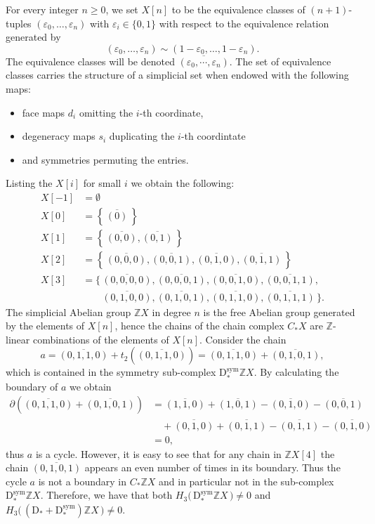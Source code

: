 \documentclass[12pt]{amsart}
\theoremstyle{plain}
\numberwithin{lemma}{\DefaultNumberTheoremWithin}
\numberwithin{claim}{\DefaultNumberTheoremWithin}
\numberwithin{theorem}{\DefaultNumberTheoremWithin}
\numberwithin{corollary}{\DefaultNumberTheoremWithin}
\numberwithin{proposition}{\DefaultNumberTheoremWithin}
\numberwithin{conjecture}{\DefaultNumberTheoremWithin}
\theoremstyle{definition}
\theoremstyle{definition}
\numberwithin{question}{\DefaultNumberTheoremWithin}
\theoremstyle{definition}
\numberwithin{problem}{\DefaultNumberTheoremWithin}
\theoremstyle{remark}
\numberwithin{remark}{\DefaultNumberTheoremWithin}
\theoremstyle{remark}
\numberwithin{example}{\DefaultNumberTheoremWithin}
\def\blt{*}
\def\ve{\varepsilon}
\def\ZZ{\mathbb Z}
\def\Deg{\mathrm{D}}    %
\def\sDeg{\Deg^{\mathrm{sym}}}  %
\newcommand{\del}{\partial}
\newcommand{\projzero}[1]{\overline{(#1)}}
\newcommand{\projone}[2]{\overline{(#1,#2)}}
\newcommand{\projtwo}[3]{\overline{(#1,#2,#3)}}
\newcommand{\projthree}[4]{\overline{(#1,#2,#3,#4)}}
\begin{document}
For every integer $n \geq 0$, we set $X[n]$ to be the equivalence classes of $(n+1)$-tuples $(\ve_0,\ldots,\ve_{n})$ with $\ve_i\in\{0,1\}$ with respect to
the equivalence relation generated by $$(\ve_0,\ldots,\ve_{n}) \sim (1-\ve_0,\ldots,1-\ve_{n}).$$ The equivalence classes 
will be denoted $\overline{(\ve_0,\cdots ,\ve_{n})}$. The set of 
equivalence classes carries the structure of a simplicial set 
when endowed with the following maps: 
\begin{itemize}
\item face maps $d_i$ omitting the $i$-th coordinate,
\item degeneracy maps $s_i$  duplicating the $i$-th coordintate
\item and symmetries permuting the entries. 
\end{itemize}
Listing the $X[i]$ for small $i$ we obtain the following:
\begin{align*}
    X[-1] &=\emptyset  \\
    X[0]  &= \left\{\,\projzero{0}\,\right\}  \\
    X[1]  &= \left\{\,\projone{0}{0},\projone{0}{1}\,\right\}\\
    X[2]  &= \left\{\,\projtwo{0}{0}{0},\projtwo{0}{0}{1},\projtwo{0}{1}{0},\projtwo{0}{1}{1} \,\right\}\\
    X[3]  &= \Big\{\,\projthree{0}{0}{0}{0},\projthree{0}{0}{0}{1},\projthree{0}{0}{1}{0},\projthree{0}{0}{1}{1},\\ &\phantom{=\big\{\,} \projthree{0}{1}{0}{0},\projthree{0}{1}{0}{1},\projthree{0}{1}{1}{0},\projthree{0}{1}{1}{1}\,\Big\}.
\end{align*}
The simplicial Abelian group $\ZZ X$ in degree $n$ is the free Abelian group generated by the elements of $X[n]$, hence the chains of the chain complex $C_\blt X$ are $\ZZ$-linear combinations of the elements of $X[n]$. Consider the chain
\[
a=\projthree{0}{1}{1}{0}+t_2\left(\projthree{0}{1}{1}{0}\right)= \projthree{0}{1}{1}{0}+\projthree{0}{1}{0}{1},
\]
which is contained in the symmetry sub-complex $\sDeg_\blt \ZZ X$.
By calculating the boundary of $a$ we obtain
\begin{align*}
    \del\left(\projthree{0}{1}{1}{0}+\projthree{0}{1}{0}{1}\right)&=\projtwo{1}{1}{0}+\projtwo{1}{0}{1}-\projtwo{0}{1}{0}-\projtwo{0}{0}{1}\\&\quad+\projtwo{0}{1}{0}+\projtwo{0}{1}{1}-\projtwo{0}{1}{1}-\projtwo{0}{1}{0}\\
    &=0,
\end{align*}
thus $a$ is a cycle. However, it is easy to see that for any chain in $\ZZ X[4]$ the chain $\projthree{0}{1}{0}{1}$ appears an even number of times in its boundary. 
Thus the cycle $a$ is not a boundary in $C_\blt\ZZ X$ and in particular not in the sub-complex $\sDeg_\blt\ZZ X$. Therefore, we have that both $H_3\big(\,\sDeg_\blt \ZZ X\,\big)\neq 0$
and $H_3\big(\,(\Deg_\blt + \sDeg_\blt) \ZZ X\,\big)\neq 0$.
\end{document}
